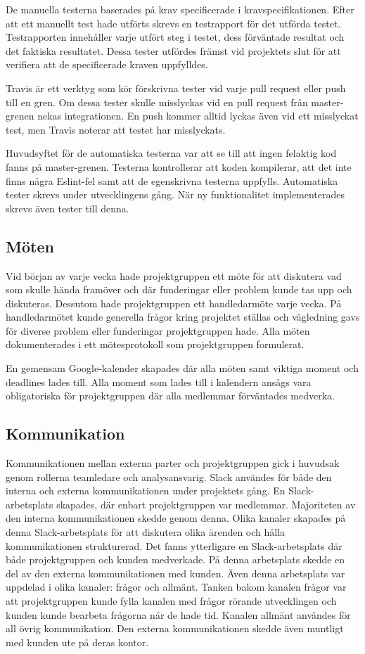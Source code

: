 De manuella testerna baserades på krav specificerade i kravspecifikationen. Efter att ett manuellt test hade utförts skrevs en testrapport för det utförda testet. Testrapporten innehåller varje utfört steg i testet, dess förväntade resultat och det faktiska resultatet. Dessa tester utfördes främst vid projektets slut för att verifiera att de specificerade kraven uppfylldes.

Travis är ett verktyg som kör förskrivna tester vid varje pull request eller push till en gren. Om dessa tester skulle misslyckas vid en pull request från master-grenen nekas integrationen. En push kommer alltid lyckas även vid ett misslyckat test, men Travis noterar att testet har misslyckats.

Huvudsyftet för de automatiska testerna var att se till att ingen felaktig kod fanns på master-grenen. Testerna kontrollerar att koden kompilerar, att det inte finns några Eslint-fel samt att de egenskrivna testerna uppfylls. Automatiska tester skrevs under utvecklingens gång. När ny funktionalitet implementerades skrevs även tester till denna.

\subsection{Möten}
Vid början av varje vecka hade projektgruppen ett möte för att diskutera vad som skulle hända framöver och där funderingar eller problem kunde tas upp och diskuteras. Dessutom hade projektgruppen ett handledarmöte varje vecka. På handledarmötet kunde generella frågor kring projektet ställas och vägledning gavs för diverse problem eller funderingar projektgruppen hade. Alla möten dokumenterades i ett mötesprotokoll som projektgruppen formulerat.

En gemensam Google-kalender skapades där alla möten samt viktiga moment och deadlines lades till. Alla moment som lades till i kalendern ansågs vara obligatoriska för projektgruppen där alla medlemmar förväntades medverka.

\pagebreak

\subsection{Kommunikation}
Kommunikationen mellan externa parter och projektgruppen gick i huvudsak genom rollerna teamledare och analysansvarig. Slack användes för både den interna och externa kommunikationen under projektets gång. En Slack-arbetsplats skapades, där enbart projektgruppen var medlemmar. Majoriteten av den interna kommunikationen skedde genom denna. Olika kanaler skapades på denna Slack-arbetsplats för att diskutera olika ärenden och hålla kommunikationen strukturerad. Det fanns ytterligare en Slack-arbetsplats där både projektgruppen och kunden medverkade. På denna arbetsplats skedde en del av den externa kommunikationen med kunden. Även denna arbetsplats var uppdelad i olika kanaler: frågor och allmänt. Tanken bakom kanalen frågor var att projektgruppen kunde fylla kanalen med frågor rörande utvecklingen och kunden kunde bearbeta frågorna när de hade tid. Kanalen allmänt användes för all övrig kommunikation. Den externa kommunikationen skedde även muntligt med kunden ute på deras kontor.

